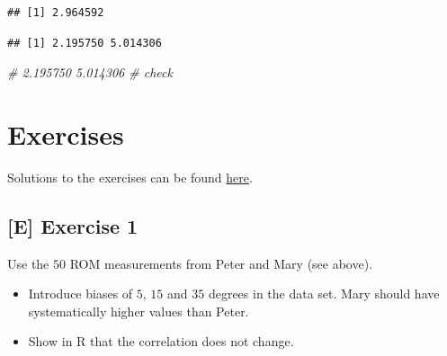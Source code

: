 \documentclass[
]{book}
\newenvironment{Shaded}{\begin{snugshade}}{\end{snugshade}}
\newcommand{\AttributeTok}[1]{\textcolor[rgb]{0.13,0.29,0.53}{#1}}
\newcommand{\CommentTok}[1]{\textcolor[rgb]{0.56,0.35,0.01}{\textit{#1}}}
\newcommand{\ConstantTok}[1]{\textcolor[rgb]{0.56,0.35,0.01}{#1}}
\newcommand{\DecValTok}[1]{\textcolor[rgb]{0.00,0.00,0.81}{#1}}
\newcommand{\FloatTok}[1]{\textcolor[rgb]{0.00,0.00,0.81}{#1}}
\newcommand{\FunctionTok}[1]{\textcolor[rgb]{0.13,0.29,0.53}{\textbf{#1}}}
\newcommand{\NormalTok}[1]{#1}
\newcommand{\SpecialCharTok}[1]{\textcolor[rgb]{0.81,0.36,0.00}{\textbf{#1}}}
\providecommand{\tightlist}{%
  \setlength{\itemsep}{0pt}\setlength{\parskip}{0pt}}
\begin{document}
\begin{verbatim}
## [1] 2.964592
\end{verbatim}

\begin{Shaded}
\end{Shaded}

\begin{verbatim}
## [1] 2.195750 5.014306
\end{verbatim}

\begin{Shaded}
\begin{Highlighting}[]
\CommentTok{\# 2.195750 5.014306 \# check}
\end{Highlighting}
\end{Shaded}

\section{Exercises}\label{exercises}

Solutions to the exercises can be found
\href{https://github.com/jdegenfellner/Script_QM3_ZHAW/tree/main/Solutions_Exercises}{here}.

\subsection{{[}E{]} Exercise 1}\label{exercise1}

Use the \(50\) ROM measurements from Peter and Mary (see above).

\begin{itemize}
\tightlist
\item
  Introduce biases of \(5\), \(15\) and \(35\) degrees in the data set. Mary should have systematically
  higher values than Peter.
\item
  Show in R that the correlation does not change.
\end{itemize}
\end{document}
